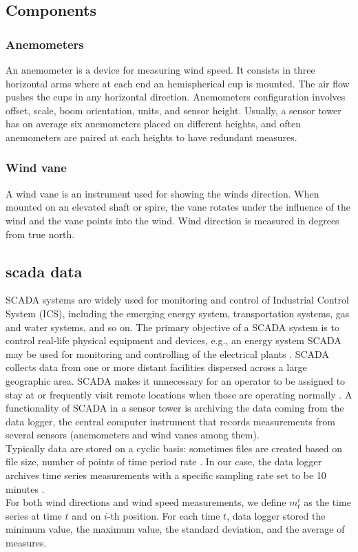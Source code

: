 \documentclass[journal]{IEEEtran}
\begin{document}
\subsection{Components}
\subsubsection{Anemometers}
An anemometer is a device for measuring wind speed. It consists in three horizontal arms where at each end an hemispherical cup is mounted. The air flow pushes the cups in any horizontal direction. Anemometers configuration involves offset, scale, boom orientation, units, and sensor height. Usually, a sensor tower has on average six anemometers placed on different heights, and often anemometers are paired at each heights to have redundant measures.\cite{clifton2014135}
\subsubsection{Wind vane}
A wind vane is an instrument used for showing the winds direction. When mounted on an elevated shaft or spire, the vane rotates under the influence of the wind and the vane points into the wind. Wind direction is measured in degrees from true north.\cite{sayigh2012comprehensive}

\subsection{scada data}\label{subsec:scadaData}
SCADA systems are widely used for monitoring and control of Industrial Control System (ICS), including the emerging energy system, transportation systems, gas and water systems, and so on. The primary objective of a SCADA system is to control real-life physical equipment and devices, e.g., an energy system SCADA may be used for monitoring and controlling of the electrical plants \cite{ahmed2015investigation}. SCADA collects data from one or more distant facilities dispersed across a large geographic area.%
SCADA makes it unnecessary for an operator to be assigned to stay at or frequently visit remote locations when those are operating normally \cite{boyer2009scada}.
A functionality of SCADA in a sensor tower is archiving the data coming from the data logger, the central computer instrument that records measurements from several sensors (anemometers and wind vanes among them).\\
Typically data are stored  on a cyclic basis: sometimes files are created based on file size, number of points of time period rate \cite{daneels1999scada}. 
In our case, the data logger archives time series measurements with a specific sampling rate set to be 10 minutes .\\
For both wind directions and wind speed measurements, we define $m_t^i$ as the time series at time $t$ and on $i$-th position. For each time $t$, data logger stored the minimum value, the maximum value, the standard deviation, and the average of measures.
\end{document}
